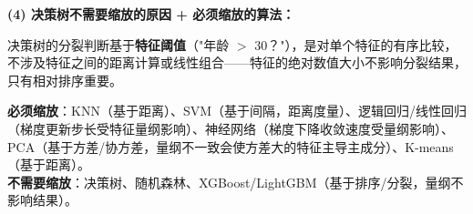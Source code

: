 \documentclass[a4paper,11pt]{ctexart}
\begin{document}
\begin{solutionbox}[参考答案与详细解析]
    \textbf{(4) 决策树不需要缩放的原因 + 必须缩放的算法：}

    决策树的分裂判断基于\textbf{特征阈值}（"年龄 $>$ 30？"），是对单个特征的有序比较，不涉及特征之间的距离计算或线性组合——特征的绝对数值大小不影响分裂结果，只有相对排序重要。

    \begin{keybox}[必须进行特征缩放的算法]
        \textbf{必须缩放}：KNN（基于距离）、SVM（基于间隔，距离度量）、逻辑回归/线性回归（梯度更新步长受特征量纲影响）、神经网络（梯度下降收敛速度受量纲影响）、PCA（基于方差/协方差，量纲不一致会使方差大的特征主导主成分）、K-means（基于距离）。\\
        \textbf{不需要缩放}：决策树、随机森林、XGBoost/LightGBM（基于排序/分裂，量纲不影响结果）。
    \end{keybox}
\end{solutionbox}
\end{document}
